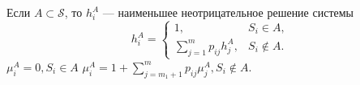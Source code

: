 \begin{theorem}
  Если $A \subset \mathscr S$, то $h_i^A$ --- наименьшее неотрицательное решение системы
  \[
    h^A_i = \begin{cases}
      1, & S_i \in A, \\
      \sum_{j=1}^m p_{ij} h_j^A, &S_i \notin A.
    \end{cases}
  \]
  $\mu^A_i = 0, S_i \in A$
  $\mu^A_i = 1 + \sum_{j=m_1+1}^{m} p_{ij} \mu_j^A, S_i \notin A$.
\end{theorem}
